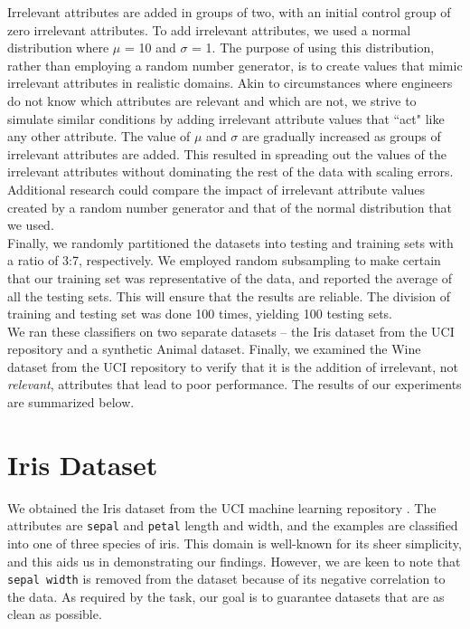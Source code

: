 \documentclass{article}
\begin{document}
Irrelevant attributes are added in groups of two, with an initial control group of zero irrelevant attributes. To add irrelevant attributes, we used a normal distribution where $\mu$ = 10 and $\sigma$ = 1. The purpose of using this distribution, rather than employing a random number generator, is to create values that mimic irrelevant attributes in realistic domains. Akin to circumstances where engineers do not know which attributes are relevant and which are not, we strive to simulate similar conditions by adding irrelevant attribute values that ``act" like any other attribute. The value of $\mu$ and $\sigma$ are gradually increased as groups of irrelevant attributes are added. This resulted in spreading out the values of the irrelevant attributes without dominating the rest of the data with scaling errors. Additional research could compare the impact of irrelevant attribute values created by a random number generator and that of the normal distribution that we used.  \\

Finally, we randomly partitioned the datasets into testing and training sets with a ratio of 3:7, respectively. We employed random subsampling to make certain that our training set was representative of the data, and reported the average of all the testing sets. This will ensure that the results are reliable. The division of training and testing set was done 100 times, yielding 100 testing sets. \\   

We ran these classifiers on two separate datasets -- the Iris dataset from the UCI repository and a synthetic Animal dataset. Finally, we examined the Wine dataset from the UCI repository to verify that it is the addition of irrelevant, not \textit{relevant}, attributes that lead to poor performance.  The results of our experiments are summarized below.

\section{Iris Dataset}

We obtained the Iris dataset from the UCI machine learning repository \cite{iris}. The attributes are \texttt{sepal} and \texttt{petal} length and width, and the examples are classified into one of three species of iris. This domain is well-known for its sheer simplicity, and this aids us in demonstrating our findings. However, we are keen to note that \texttt{sepal width} is removed from the dataset because of its negative correlation to the data. As required by the task, our goal is to guarantee datasets that are as clean as possible. \\ 
\end{document}
